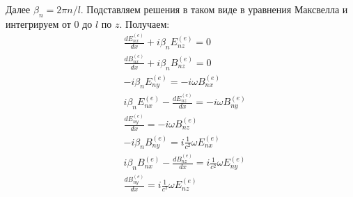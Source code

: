 \documentclass[a4paper,12pt]{extarticle} %
\newcommand{\Dff}[2]{\frac{d #1}{d #2}}
\begin{document}
Далее $\beta_n = 2 \pi n/l$. Подставляем решения в таком виде в уравнения Максвелла и интегрируем от 0 до $l$ по $z$. Получаем:
\begin{align}
& \Dff{E^{(e)}_{nx}}{x} + i \beta_n E^{(e)}_{nz} = 0 									\label{eqp1}\\
& \Dff{B^{(e)}_{nx}}{x} + i \beta_n B^{(e)}_{nz} = 0 									\label{eqp2}\\ 
& - i \beta_n E^{(e)}_{ny} = - i \omega B^{(e)}_{nx} 									\label{eqp3}\\
& i \beta_n E^{(e)}_{nx} - \Dff{E^{(e)}_{nz}}{x} = - i \omega B^{(e)}_{ny} 				\label{eqp4}\\
& \Dff{E^{(e)}_{ny}}{x} = - i \omega B^{(e)}_{nz} 										\label{eqp5}\\
& - i \beta_n B^{(e)}_{ny} = i \frac{1}{c^2} \omega E^{(e)}_{nx} 						\label{eqp6}\\
& i \beta_n B^{(e)}_{nx} - \Dff{B^{(e)}_{nz}}{x} = i \frac{1}{c^2} \omega E^{(e)}_{ny} 	\label{eqp7}\\
& \Dff{B^{(e)}_{ny}}{x} = i \frac{1}{c^2} \omega E^{(e)}_{nz}							\label{eqp8}
\end{align}
\end{document}
